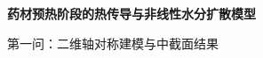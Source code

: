 \documentclass[UTF8,a4paper,zihao=-4,fontset=fandol]{ctexart}
\begin{document}
\begin{center}
  {\LARGE\bfseries 药材预热阶段的热传导与非线性水分扩散模型\par}
  \vspace{7pt}
  {\large 第一问：二维轴对称建模与中截面结果\par}
\end{center}
\vspace{3pt}

\end{document}
